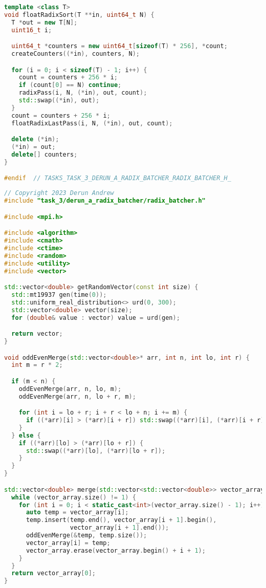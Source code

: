 \documentclass{report}
\begin{document}
\begin{lstlisting}[language=C++]
template <class T>
void floatRadixSort(T **in, uint64_t N) {
  T *out = new T[N];
  uint16_t i;

  uint64_t *counters = new uint64_t[sizeof(T) * 256], *count;
  createCounters((*in), counters, N);

  for (i = 0; i < sizeof(T) - 1; i++) {
    count = counters + 256 * i;
    if (count[0] == N) continue;
    radixPass(i, N, (*in), out, count);
    std::swap((*in), out);
  }
  count = counters + 256 * i;
  floatRadixLastPass(i, N, (*in), out, count);

  delete (*in);
  (*in) = out;
  delete[] counters;
}

#endif  // TASKS_TASK_3_DERUN_A_RADIX_BATCHER_RADIX_BATCHER_H_
\end{lstlisting}

\begin{lstlisting}[language=C++]
// Copyright 2023 Derun Andrew
#include "task_3/derun_a_radix_batcher/radix_batcher.h"

#include <mpi.h>

#include <algorithm>
#include <cmath>
#include <ctime>
#include <random>
#include <utility>
#include <vector>

std::vector<double> getRandomVector(const int size) {
  std::mt19937 gen(time(0));
  std::uniform_real_distribution<> urd(0, 300);
  std::vector<double> vector(size);
  for (double& value : vector) value = urd(gen);

  return vector;
}

void oddEvenMerge(std::vector<double>* arr, int n, int lo, int r) {
  int m = r * 2;

  if (m < n) {
    oddEvenMerge(arr, n, lo, m);
    oddEvenMerge(arr, n, lo + r, m);

    for (int i = lo + r; i + r < lo + n; i += m) {
      if ((*arr)[i] > (*arr)[i + r]) std::swap((*arr)[i], (*arr)[i + r]);
    }
  } else {
    if ((*arr)[lo] > (*arr)[lo + r]) {
      std::swap((*arr)[lo], (*arr)[lo + r]);
    }
  }
}

std::vector<double> merge(std::vector<std::vector<double>> vector_array) {
  while (vector_array.size() != 1) {
    for (int i = 0; i < static_cast<int>(vector_array.size() - 1); i++) {
      auto temp = vector_array[i];
      temp.insert(temp.end(), vector_array[i + 1].begin(),
                  vector_array[i + 1].end());
      oddEvenMerge(&temp, temp.size());
      vector_array[i] = temp;
      vector_array.erase(vector_array.begin() + i + 1);
    }
  }
  return vector_array[0];
}


\end{lstlisting}
\end{document}
